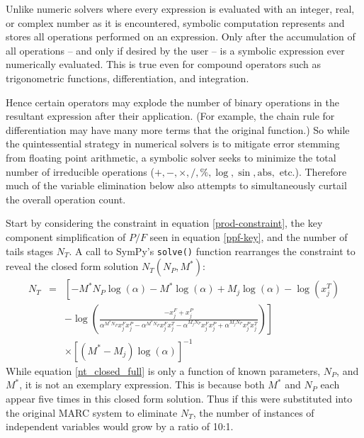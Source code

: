 \documentclass{ansconf}
\begin{document}
Unlike numeric solvers where every expression is evaluated with an integer, real, or
complex number as it is encountered, symbolic computation represents and stores all 
operations performed on an expression.  Only after the accumulation of all 
operations -- and only if desired by the user -- is a symbolic expression ever numerically
evaluated.  This is true even for compound operators such as trigonometric functions, 
differentiation, and integration.

Hence certain operators may explode the number of binary
operations in the resultant expression after their application. 
(For example, the chain rule for differentiation may have many more terms that 
the original function.)
So while the quintessential strategy in numerical solvers is to mitigate error
stemming from floating point arithmetic, a symbolic solver seeks to minimize the total
number of irreducible operations ($+, -, \times, /, \%, \log, \sin, \mbox{abs},$ etc.). 
Therefore much of the variable
elimination below also attempts to simultaneously curtail the overall operation count. 

Start by considering the constraint in equation \ref{prod-constraint}, the key 
component simplification of $P/F$ seen in equation \ref{ppf-key}, and the number
of tails stages $N_T$.  A call to SymPy's \texttt{solve()} function rearranges the 
constraint to reveal the closed form solution $N_T(N_P, M^*)$:
\begin{equation}
\begin{array}{lcl}
N_T & = & \left[- M^{*} N_{P} \log{\left (\alpha \right )} - M^{*} \log{\left (\alpha \right )} + M_{j} \log{\left (\alpha \right )} - \log{\left (x^{T}_{j} \right )} \right. \\ 
& & \left. - \log{\left (\frac{- x^{F}_{j} + x^{P}_{j}}{\alpha^{M^{*} N_{P}} x^{F}_{j} x^{P}_{j} - \alpha^{M^{*} N_{P}}x^{F}_{j} x^{T}_{j} - \alpha^{M_{j} N_{P}} x^{F}_{j} x^{P}_{j} + \alpha^{M_{j} N_{P}} x^{P}_{j} x^{T}_{j}} \right )} \right] \\
& & \times \left[\left(M^{*} - M_{j}\right) \log{\left (\alpha \right )} \right]^{-1}
\end{array}
\label{nt_closed_full}
\end{equation}
While equation \ref{nt_closed_full} is only a function of known 
parameters, $N_P$, and $M^*$, it is not an exemplary expression.  This is because both 
$M^*$ and $N_P$ each appear five times in this closed form solution.  Thus if this 
were substituted into the original MARC system to eliminate $N_T$, the number of 
instances of independent variables would grow by a ratio of 10:1.    
\end{document}
